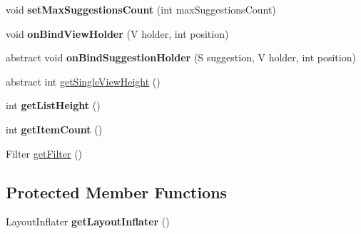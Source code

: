 \begin{DoxyCompactItemize}
\item 
\mbox{\label{classcom_1_1example_1_1searchwidget_1_1adapter_1_1_suggestions_adapter_a13781c358775ea2666f7feff1bbfd8d3}} 
void {\bfseries set\+Max\+Suggestions\+Count} (int max\+Suggestions\+Count)
\item 
\mbox{\label{classcom_1_1example_1_1searchwidget_1_1adapter_1_1_suggestions_adapter_ada04416ccc16b867639cdf890f2b1b49}} 
void {\bfseries on\+Bind\+View\+Holder} (V holder, int position)
\item 
\mbox{\label{classcom_1_1example_1_1searchwidget_1_1adapter_1_1_suggestions_adapter_a5675b07715faacc6b4a4bb0800cc5e72}} 
abstract void {\bfseries on\+Bind\+Suggestion\+Holder} (S suggestion, V holder, int position)
\item 
abstract int \mbox{\hyperlink{classcom_1_1example_1_1searchwidget_1_1adapter_1_1_suggestions_adapter_aaf293d78ccf1a0fd43c9c3dee5dbd567}{get\+Single\+View\+Height}} ()
\item 
\mbox{\label{classcom_1_1example_1_1searchwidget_1_1adapter_1_1_suggestions_adapter_ad6db0de2b373bb5c44f9d399846d37aa}} 
int {\bfseries get\+List\+Height} ()
\item 
\mbox{\label{classcom_1_1example_1_1searchwidget_1_1adapter_1_1_suggestions_adapter_ae2289ecf96f56a892450b7a78536c6e3}} 
int {\bfseries get\+Item\+Count} ()
\item 
Filter \mbox{\hyperlink{classcom_1_1example_1_1searchwidget_1_1adapter_1_1_suggestions_adapter_ac5668046367eab0b8c0dbffaf378e0b9}{get\+Filter}} ()
\end{DoxyCompactItemize}
\subsection*{Protected Member Functions}
\begin{DoxyCompactItemize}
\item 
\mbox{\label{classcom_1_1example_1_1searchwidget_1_1adapter_1_1_suggestions_adapter_ac3d51c05737f8a8e216c82b6583410e7}} 
Layout\+Inflater {\bfseries get\+Layout\+Inflater} ()
\end{DoxyCompactItemize}
